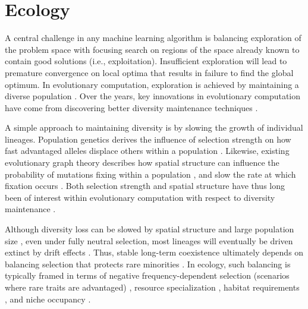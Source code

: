 \section{Ecology}
\label{sec:diversity-maintenance}

A central challenge in any machine learning algorithm is balancing exploration of the problem space with focusing search on regions of the space already known to contain good solutions (i.e., exploitation).
Insufficient exploration will lead to premature convergence on local optima that results in failure to find the global optimum.
In evolutionary computation, exploration is achieved by maintaining a diverse population \citep{sudholt2019benefits}.
Over the years, key innovations in evolutionary computation have come from discovering better diversity maintenance techniques \citep{goldberg1987genetic, wang2019poet}.

A simple approach to maintaining diversity is by slowing the growth of individual lineages.
Population genetics derives the influence of selection strength on how fast advantaged alleles displace others within a population \citep{kimura1980average}.
Likewise, existing evolutionary graph theory describes how spatial structure can influence the probability of mutations fixing within a population \citep{lieberman2005evolutionary}, and slow the rate at which fixation occurs \citep{frean2013effect}.
Both selection strength and spatial structure have thus long been of interest within evolutionary computation with respect to diversity maintenance \citep{simon2008biogeographybased,blickle1995comparison}.

Although diversity loss can be slowed by spatial structure and large population size \citep{slatkin1981fixation,kimura1969average}, even under fully neutral selection, most lineages will eventually be driven extinct by drift effects \citep{wright1931evolution,fisher1930genetical,kingman1982coalescent}.
Thus, stable long-term coexistence ultimately depends on balancing selection that protects rare minorities \citep{chesson2000mechanisms}.
In ecology, such balancing is typically framed in terms of negative frequency-dependent selection (scenarios where rare traits are advantaged) \citep{brisson2018negative,clarke1979evolution,wright1939distribution,levin1988frequency}, resource specialization \citep{tilman1980resources}, habitat requirements \citep{grinnell1917niche}, and niche occupancy \citep{hutchinson1957concluding}.

